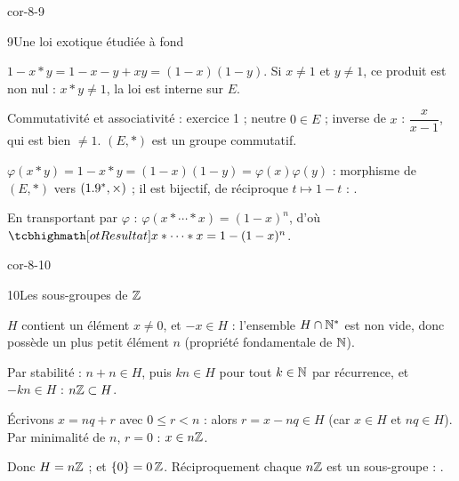 \begin{blocLivre}{cor-8-9}
\begin{corrige}{9}{Une loi exotique étudiée à fond}
\begin{questions}
  \item $1-x*y=1-x-y+xy=(1-x)(1-y)$. Si $x\neq1$ et $y\neq1$, ce produit
    est non nul : $x*y\neq1$, la loi est interne sur $E$.
  \item Commutativité et associativité : exercice 1 ; neutre $0\in E$ ;
    inverse de $x$ : $\dfrac{x}{x-1}$, qui est bien $\neq1$. $(E,*)$ est
    un groupe commutatif.
  \item $\varphi(x*y)=1-x*y=(1-x)(1-y)=\varphi(x)\varphi(y)$ : morphisme de
    $(E,*)$ vers $(1.9^{*},\times)$ ; il est bijectif, de réciproque
    $t\mapsto1-t$ : .
  \item En transportant par $\varphi$ :
    $\varphi(x*\cdots*x)=(1-x)^{n}$, d'où
    $\res{x*\cdots*x=1-(1-x)^{n}}$.
\end{questions}
\end{corrige}
\end{blocLivre}

\begin{blocLivre}{cor-8-10}
\begin{corrige}{10}{Les sous-groupes de $\mathbb{Z}$}
\begin{questions}
  \item $H$ contient un élément $x\neq0$, et $-x\in H$ : l'ensemble
    $H\cap\mathbb{N}^{*}$ est non vide, donc possède un plus petit élément $n$
    (propriété fondamentale de $\mathbb{N}$).
  \item Par stabilité : $n+n\in H$, puis $kn\in H$ pour tout $k\in\mathbb{N}$ par
    récurrence, et $-kn\in H$ : $n\mathbb{Z}\subset H$.
  \item Écrivons $x=nq+r$ avec $0\leq r<n$ : alors $r=x-nq\in H$ (car
    $x\in H$ et $nq\in H$). Par minimalité de $n$, $r=0$ : $x\in n\mathbb{Z}$.
  \item Donc $H=n\mathbb{Z}$ ; et $\left\{0\right\}=0\,\mathbb{Z}$. Réciproquement chaque $n\mathbb{Z}$ est
    un sous-groupe : .
\end{questions}
\end{corrige}
\end{blocLivre}

